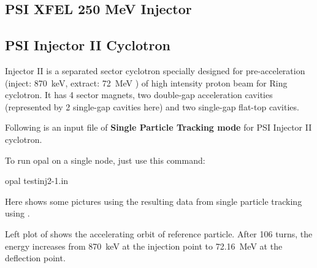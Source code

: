 \subsection{PSI XFEL 250 MeV Injector}
\label{sec:felinj}



\subsection{PSI Injector II Cyclotron}
\label{sec:inj2}
Injector II is a separated sector cyclotron specially designed for pre-acceleration (inject: \SI{870}{\kilo\electronvolt}, extract: \SI{72}{\mega\electronvolt} )
of high intensity proton beam for Ring cyclotron. It has 4 sector magnets, two double-gap acceleration cavities
(represented by 2 single-gap cavities here) and two single-gap flat-top cavities.

Following is an input file of {\bfseries Single Particle Tracking mode} for PSI Injector II cyclotron.


To run opal on a single node, just use this command:
\begin{example}
 opal testinj2-1.in
\end{example}

Here shows some pictures using the resulting data from single particle tracking using \opalcycl.

Left plot of  shows the accelerating orbit of reference particle. After 106 turns, the energy increases from \SI{870}{\kilo\electronvolt} at the injection point to \SI{72.16}{\mega\electronvolt} at the deflection point.

